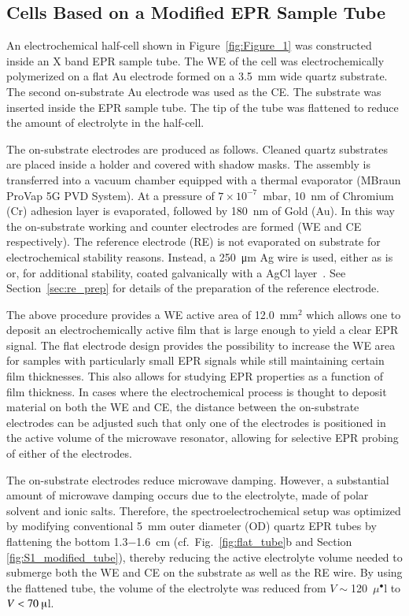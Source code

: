 \newpage
\subsection{Cells Based on a Modified EPR Sample Tube}
\label{sec:tube_cell}
\label{electrode_setup}

An electrochemical half-cell shown in Figure~\ref{fig:Figure_1} was constructed inside an X band EPR sample tube. The WE of the cell was electrochemically polymerized on a flat Au electrode formed on a 3.5~mm wide quartz substrate. The second on-substrate Au electrode was used as the CE. The substrate was inserted inside the EPR sample tube. The tip of the tube was flattened to reduce the amount of electrolyte in the half-cell.\\
\par
The on-substrate electrodes are produced as follows. Cleaned quartz substrates are placed inside a holder and covered with shadow masks. The assembly is transferred into a vacuum chamber equipped with a thermal evaporator (MBraun ProVap 5G PVD System). At a pressure of $7\times10^{-7}$~mbar, 10~nm of Chromium (Cr) adhesion layer is evaporated, followed by 180~nm of Gold (Au). In this way the on-substrate working and counter electrodes are formed (WE and CE respectively). The reference electrode (RE) is not evaporated on substrate for electrochemical stability reasons. Instead, a \SI{250}{\micro\meter} Ag wire is used, either as is or, for additional stability, coated galvanically with a AgCl layer~\cite{Safari2011}. See Section~\ref{sec:re_prep} for details of the preparation of the reference electrode.\\
\par
The above procedure provides a WE active area of 12.0~mm$^2$ which allows one to deposit an electrochemically active film that is large enough to yield a clear EPR signal. The flat electrode design provides the possibility to increase the WE area for samples with particularly small EPR signals while still maintaining certain film thicknesses. This also allows for studying EPR properties as a function of film thickness. In cases where the electrochemical process is thought to deposit material on both the WE and CE, the distance between the on-substrate electrodes can be adjusted such that only one of the electrodes is positioned in the active volume of the microwave resonator, allowing for selective EPR probing of either of the electrodes.\\
\par
The on-substrate electrodes reduce microwave damping. However, a substantial amount of microwave damping occurs due to the electrolyte, made of polar solvent and ionic salts. Therefore, the spectroelectrochemical setup was optimized by modifying conventional 5~mm outer diameter (OD) quartz EPR tubes by flattening the bottom 1.3$-$1.6~cm (cf.\ Fig.~\ref{fig:flat_tube}b and Section \ref{fig:S1_modified_tube}), thereby reducing the active electrolyte volume needed to submerge both the WE and CE on the substrate as well as the RE wire. By using the flattened tube, the volume of the electrolyte was reduced from $V\sim$120~$\mu^{\bullet}$l to $V<70~\muup$l.


